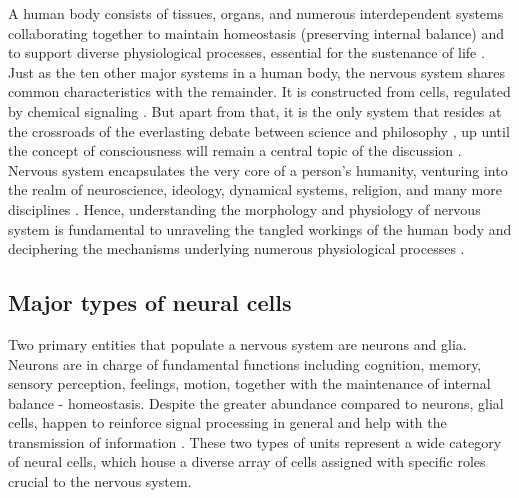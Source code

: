 \documentclass[class={myRUCProject}, crop=false]{standalone}
\begin{document}


A human body consists of tissues, organs, and numerous interdependent systems collaborating together to maintain homeostasis (preserving internal balance) and to support diverse physiological processes, essential for the sustenance of life \cite{inbook2023Com}. 
Just as the ten other major systems in a human body, the nervous system shares common characteristics with the remainder. It is constructed from cells, regulated by chemical signaling \cite{SHOYKHET2011783}. 
But apart from that, it is the only system that resides at the crossroads of the everlasting debate between science and philosophy \cite{SHOYKHET2011783,cons2002}, up until the concept of consciousness will remain a central topic of the discussion \cite{cons2002}. 
Nervous system encapsulates the very core of a person's humanity, venturing into the realm of neuroscience, ideology, dynamical systems, religion, and many more disciplines \cite{SHOYKHET2011783,cons2002}. 
Hence, understanding the morphology and physiology of nervous system is fundamental to unraveling the tangled workings of the human body and deciphering the mechanisms underlying numerous physiological processes \cite{SHOYKHET2011783}.

\subsection*{Major types of neural cells}

Two primary entities that populate a nervous system are neurons and glia. 
Neurons are in charge of fundamental functions including cognition, memory, sensory perception, feelings, motion, together with the maintenance of internal balance - homeostasis. Despite the greater abundance compared to neurons, glial cells, happen to reinforce signal processing in general and help with the transmission of information \cite{SHOYKHET2011783}. 
These two types of units represent a wide category of neural cells, which house a diverse array of cells assigned with specific roles crucial to the nervous system.
\end{document}
